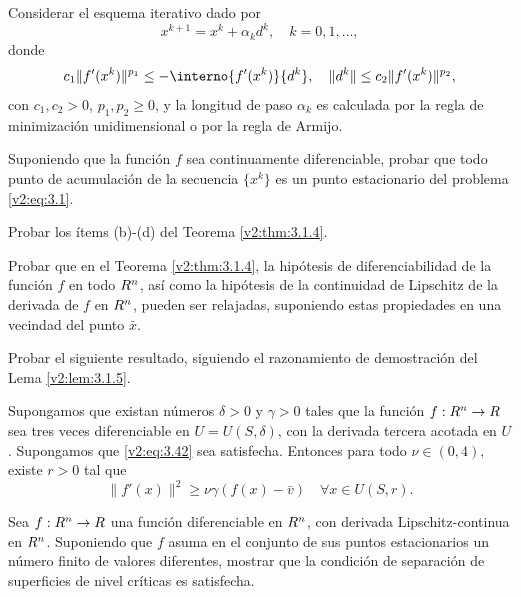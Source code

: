 \begin{exercise}\label{v2:ejer:3.1.6}
    Considerar el esquema iterativo dado por
    \[
        x^{k+1} = x^k + \alpha_k d^k, \quad k = 0, 1, \dots,
    \]
    donde
    \[
        c_1 \|f'(x^k)\|^{p_1} \le -\interno{f'(x^k)}{d^k}, \quad \|d^k\| \le c_2 \|f'(x^k)\|^{p_2},
    \]
    con $c_1, c_2 > 0$, $p_1, p_2 \ge 0$, y la longitud de paso $\alpha_k$ es calculada por la regla de minimización unidimensional o por la regla de Armijo.
    
    Suponiendo que la función $f$ sea continuamente diferenciable, probar que todo punto de acumulación de la secuencia $\{x^k\}$ es un punto estacionario del problema \eqref{v2:eq:3.1}.
\end{exercise}

\begin{exercise}\label{v2:ejer:3.1.7}
    Probar los ítems (b)-(d) del Teorema \ref{v2:thm:3.1.4}.
\end{exercise}

\begin{exercise}\label{v2:ejer:3.1.8}
    Probar que en el Teorema \ref{v2:thm:3.1.4}, la hipótesis de diferenciabilidad de la función $f$ en todo $R^n$, así como la hipótesis de la continuidad de Lipschitz de la derivada de $f$ en $R^n$, pueden ser relajadas, suponiendo estas propiedades en una vecindad del punto $\bar{x}$.
\end{exercise}

\begin{exercise}\label{v2:ejer:3.1.9}
    Probar el siguiente resultado, siguiendo el razonamiento de demostración del Lema \ref{v2:lem:3.1.5}.
    
    Supongamos que existan números $\delta > 0$ y $\gamma > 0$ tales que la función $f : R^n \to R$ sea tres veces diferenciable en $U = U(S, \delta)$, con la derivada tercera acotada en $U$. Supongamos que \eqref{v2:eq:3.42} sea satisfecha. Entonces para todo $\nu \in (0, 4)$, existe $r > 0$ tal que
    \[
        \|f'(x)\|^2 \ge \nu \gamma (f(x) - \bar{v}) \quad \forall x \in U(S, r).
    \]
\end{exercise}

\begin{exercise}\label{v2:ejer:3.1.10}
    Sea $f : R^n \to R$ una función diferenciable en $R^n$, con derivada Lipschitz-continua en $R^n$. Suponiendo que $f$ asuma en el conjunto de sus puntos estacionarios un número finito de valores diferentes, mostrar que la condición de separación de superficies de nivel críticas es satisfecha.
\end{exercise}

